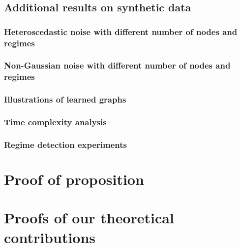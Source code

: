 \documentclass{article}
\theoremstyle{plain}
\theoremstyle{definition}
\theoremstyle{remark}
\begin{document}
\subsection{Additional results on synthetic data}
\subsubsection{Heteroscedastic noise with different number of nodes and regimes}
\label{hetero}

\subsubsection{Non-Gaussian noise with different number of nodes and regimes}
\label{nongauss}

\subsubsection{Illustrations of learned graphs}

\subsubsection{Time complexity analysis}
\label{Time_complexity}

\subsubsection{Regime detection experiments}
\label{regime_detect_exp}

\section{Proof of proposition}
\label{prop_proof}

\section{Proofs of our theoretical contributions}
\label{theorems proof}




\end{document}
